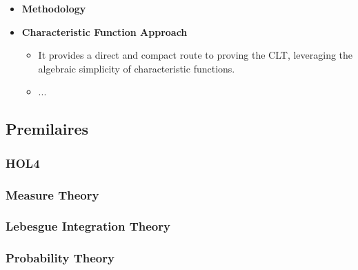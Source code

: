 \begin{itemize}
    \item \textbf{Methodology}
    \item \textbf{Characteristic Function Approach}
    \begin{itemize}
        \item It provides a direct and compact route to proving the CLT, leveraging the algebraic simplicity of characteristic functions.
        \item ...
    \end{itemize}
\end{itemize}

\subsection{Premilaires}
\subsubsection{HOL4}
\cite{tian2022assumption}
\subsubsection{Measure Theory}
\cite{qasim2016formalization}
\subsubsection{Lebesgue Integration Theory}
\cite{qasim2016formalization}
\subsubsection{Probability Theory}
\cite{qasim2016formalization}

\newpage
